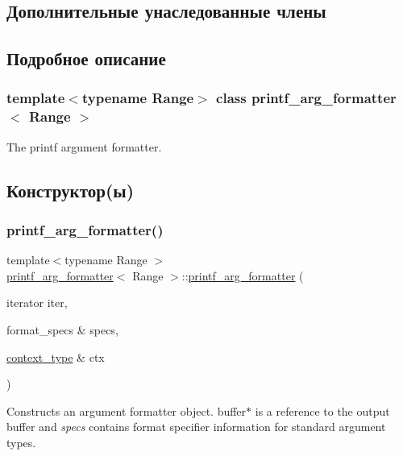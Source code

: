 \subsection*{Дополнительные унаследованные члены}


\subsection{Подробное описание}
\subsubsection*{template$<$typename Range$>$\newline
class printf\+\_\+arg\+\_\+formatter$<$ Range $>$}

The {\ttfamily printf} argument formatter.  

\subsection{Конструктор(ы)}
\mbox{\label{classprintf__arg__formatter_affaad59bc384a1d5c22aa5a80d3804ee}} 
\subsubsection{\texorpdfstring{printf\+\_\+arg\+\_\+formatter()}{printf\_arg\_formatter()}}
{\footnotesize\ttfamily template$<$typename Range $>$ \\
\hyperlink{classprintf__arg__formatter}{printf\+\_\+arg\+\_\+formatter}$<$ Range $>$\+::\hyperlink{classprintf__arg__formatter}{printf\+\_\+arg\+\_\+formatter} (\begin{DoxyParamCaption}\item[{iterator}]{iter,  }\item[{format\+\_\+specs \&}]{specs,  }\item[{\hyperlink{classbasic__printf__context}{context\+\_\+type} \&}]{ctx }\end{DoxyParamCaption})\hspace{0.3cm}{\ttfamily [inline]}}

Constructs an argument formatter object. buffer$\ast$ is a reference to the output buffer and {\itshape specs} contains format specifier information for standard argument types.  

